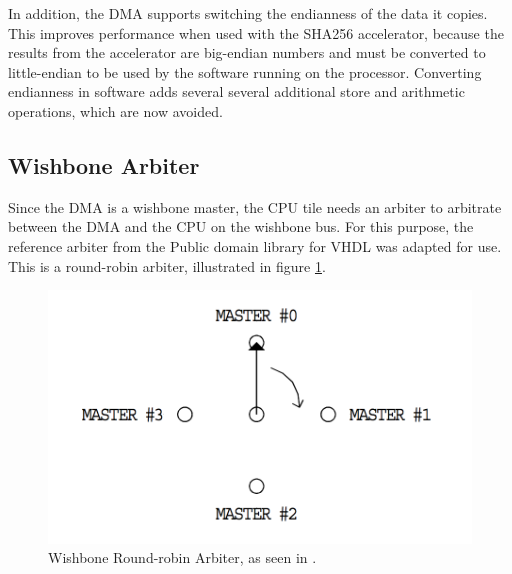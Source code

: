 In addition, the DMA supports switching the endianness of the data it copies. This improves performance
when used with the SHA256 accelerator, because the results from the accelerator are big-endian numbers
and must be converted to little-endian to be used by the software running on the processor. Converting
endianness in software adds several several additional store and arithmetic operations, which are now avoided.

\subsection{Wishbone Arbiter}
Since the DMA is a wishbone master, the CPU tile needs an arbiter to arbitrate between the DMA and the CPU
on the wishbone bus. For this purpose, the reference arbiter from the Public domain library for VHDL \cite{WBLibrary}
was adapted for use. This is a round-robin arbiter, illustrated in figure \ref{fig:WBArbiter}.

%
%
\begin{figure}[htb]
    \centering
    \includegraphics[width=1.0\textwidth]{Figures/Tile/WBArbiter}
    \caption{Wishbone Round-robin Arbiter, as seen in \cite{WBLibrary}.}
    \label{fig:WBArbiter}
\end{figure}

